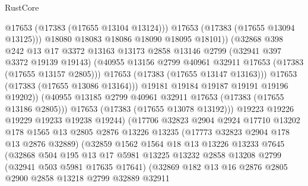 \begin{lexlean}{RustCore}
\begin{coremodule}
                              @17653
                              (@17383 (@17655 @13104 @13124)))
                            @17653
                            (@17383 (@17655 @13094 @13125)))
                          @18080
                          @18083
                          @18086
                          @18090
                          @18095
                          @18101))
                      (@32868
                        @398
                        @242
                        @13
                        @17
                        @3372
                        @13163
                        @13173
                        @2858
                        @13146
                        @2799
                        (@32941 @397 @3372 @19139 @19143)
                        (@40955 @13156 @2799 @40961 @32911 @17653 (@17383 (@17655 @13157 @2805)))
                        @17653
                        (@17383 (@17655 @13147 @13163)))
                      @17653
                      (@17383 (@17655 @13086 @13164)))
                    @19181
                    @19184
                    @19187
                    @19191
                    @19196
                    @19202))
                (@40955 @13185 @2799 @40961 @32911 @17653 (@17383 (@17655 @13186 @2805)))
                @17653
                (@17383 (@17655 @13078 @13192)))
              @19223
              @19226
              @19229
              @19233
              @19238
              @19244)
            (@17706
              @32823
              @2904
              @2924
              @17710
              @13202
              @178
              @1565
              @13
              @2805
              @2876
              @13226
              @13235
              (@17773 @32823 @2904 @178 @13 @2876 @32889)
              (@32859
                @1562
                @1564
                @18
                @13
                @13226
                @13233
                @7645
                (@32868
                  @504
                  @195
                  @13
                  @17
                  @5981
                  @13225
                  @13232
                  @2858
                  @13208
                  @2799
                  (@32941 @503 @5981 @17635 @17641)
                  (@32869
                    @182
                    @13
                    @16
                    @2876
                    @2805
                    @2900
                    @2858
                    @13218
                    @2799
                    @32889
                    @32911

\end{coremodule}
\end{lexlean}
